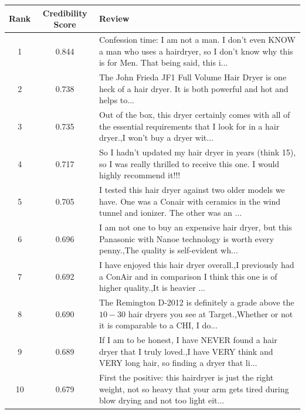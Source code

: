 \documentclass{mcmthesis}
\begin{document}
\begin{appendices}
\begin{center}
\begin{tabularx}{0.95\textwidth}{|c|c|X|}
\end{tabularx}
\end{center}
\begin{center}
\begin{tabularx}{0.95\textwidth}{|c|c|X|}
\hline
\multicolumn{1}{|l|}{Rank} &
  \textbf{Credibility Score} &
  \textbf{Review} \\ \hline
1 &
  0.844 &
  Confession time: I am not a man. I don't even KNOW a man who uses a hairdryer, so I don't know why this is for Men. That being said, this i... \\ \hline
2 &
  0.738 &
  The John Frieda JF1 Full Volume Hair Dryer is one heck of a hair dryer. It is both powerful and hot and helps to... \\ \hline
3 &
  0.735 &
  Out of the box, this dryer certainly comes with all of the essential requirements that I look for in a hair dryer.,I won't buy a dryer wit... \\ \hline
4 &
  0.717 &
  So I hadn't updated my hair dryer in years (think 15), so I was really thrilled to receive this one. I would highly recommend it!!! \\ \hline
5 &
  0.705 &
  I tested this hair dryer against two older models we have. One was a Conair with ceramics in the wind tunnel and ionizer. The other was an ... \\ \hline
6 &
  0.696 &
  I am not one to buy an expensive hair dryer, but this Panasonic with Nanoe technology is worth every penny.,The quality is self-evident wh... \\ \hline
7 &
  0.692 &
  I have enjoyed this hair dryer overall.,I previously had a ConAir and in comparison I think this one is of higher quality.,It is heavier ... \\ \hline
8 &
  0.690 &
  The Remington D-2012 is definitely a grade above the $10-$30 hair dryers you see at Target.,Whether or not it is comparable to a CHI, I do... \\ \hline
9 &
  0.689 &
  If I am to be honest, I have NEVER found a hair dryer that I truly loved.,I have VERY think and VERY long hair, so finding a dryer that li... \\ \hline
10 & 0.679 & First the positive: this hairdryer is just the right weight, not so heavy that your arm gets tired during blow drying and not too light eit... \\ \hline
\end{tabularx}
\end{center}
\begin{center}
\begin{tabularx}{0.95\textwidth}{|c|c|X|}

\end{tabularx}
\end{center}
\end{appendices}
\end{document}
